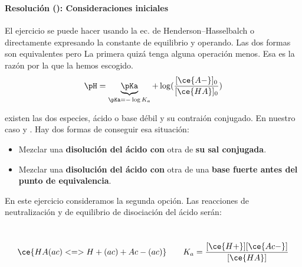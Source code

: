 \begin{frame}
	\frametitle{\ejerciciocmd}
	\framesubtitle{Resolución (): Consideraciones iniciales}
	El ejercicio se puede hacer usando la ec. de Henderson--Hasselbalch o directamente expresando la constante de equilibrio y operando. Las dos formas son equivalentes pero La primera quizá tenga alguna operación menos. Esa es la razón por la que la hemos escogido.
	$$
		\pH = \underbrace{\pKa}_{\pKa = -\log K_a} + \log(\frac{[\ce{A-}]_0}{[\ce{HA}]_0})
	$$
	
	 existen las dos especies, ácido o base débil y su contraión conjugado. En nuestro caso  y . Hay dos formas de conseguir esa situación:
	\begin{itemize}
		\item Mezclar una \textbf{disolución del ácido con} otra de \textbf{su sal conjugada}.
		\item Mezclar una \textbf{disolución del ácido con} otra de una \textbf{base fuerte antes del punto de equivalencia}.
	\end{itemize}
	En este ejercicio consideramos la segunda opción. Las reacciones de neutralización y de equilibrio de disociación del ácido serán:
	\begin{center}
		\\
		$$
			\ce{HA(ac) <=> H+(ac) + Ac-(ac)}\qquad K_a=\frac{[\ce{H+}][\ce{Ac-}]}{[\ce{HA}]}
		$$
	\end{center}
\end{frame}

